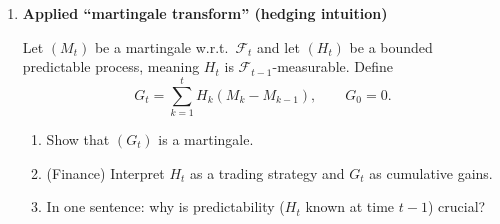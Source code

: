 \documentclass[11pt]{article}
\begin{document}
\begin{enumerate}
\bigskip

\item \textbf{Applied ``martingale transform'' (hedging intuition)}

Let $(M_t)$ be a martingale w.r.t.\ $\mathcal{F}_t$ and let $(H_t)$ be a bounded predictable process,
meaning $H_t$ is $\mathcal{F}_{t-1}$-measurable.
Define
\[
G_t=\sum_{k=1}^t H_k(M_k-M_{k-1}),\qquad G_0=0.
\]
\begin{enumerate}
\item Show that $(G_t)$ is a martingale.
\item (Finance) Interpret $H_t$ as a trading strategy and $G_t$ as cumulative gains.
\item In one sentence: why is predictability ($H_t$ known at time $t-1$) crucial?
\end{enumerate}

\end{enumerate}
\end{document}
